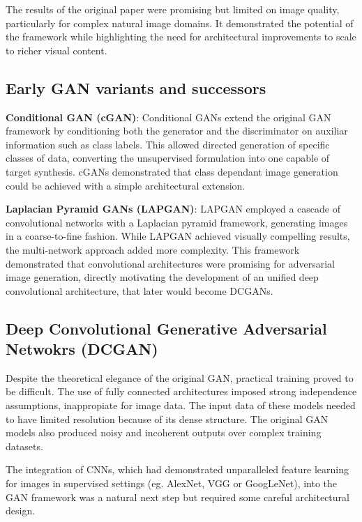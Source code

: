 \documentclass[twocolumn]{article}
\begin{document}
The results of the original paper were promising but limited on image quality, particularly for complex
natural image domains. It demonstrated the potential of the framework while highlighting the need
for architectural improvements to scale to richer visual content.

\subsection{Early GAN variants and successors}

\textbf{Conditional GAN (cGAN)}: \cite{mirza2014conditional} Conditional GANs extend the original GAN framework by conditioning both the generator
and the discriminator on auxiliar information such as class labels. This allowed directed generation of specific
classes of data, converting the unsupervised formulation into one capable of target synthesis. cGANs demonstrated
that class dependant image generation could be achieved with a simple architectural extension.

\textbf{Laplacian Pyramid GANs (LAPGAN)}: \cite{denton2015deep} LAPGAN employed a cascade of convolutional networks with
a Laplacian pyramid framework, generating images in a coarse-to-fine fashion. While LAPGAN achieved visually
compelling results, the multi-network approach added more complexity. This framework demonstrated
that convolutional architectures were promising for adversarial image generation, directly motivating
the development of an unified deep convolutional architecture, that later would become DCGANs.

\subsection{Deep Convolutional Generative Adversarial Netwokrs (DCGAN)}

Despite the theoretical elegance of the original GAN, practical training proved to be difficult. The use of
fully connected architectures imposed strong independence assumptions, inappropiate for image data. The input data
of these models needed to have limited resolution because of its dense structure. The original GAN models also
produced noisy and incoherent outputs over complex training datasets.

The integration of CNNs, which had demonstrated unparalleled feature learning for images in supervised settings (eg. AlexNet,
VGG or GoogLeNet), into the GAN framework was a natural next step but required some careful architectural design.
\end{document}

